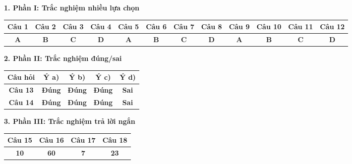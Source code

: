 \documentclass[12pt,a4paper]{article}
\begin{document}
\vspace{0.2cm}
\textbf{1. Phần I: Trắc nghiệm nhiều lựa chọn}
\begin{center}
{\setlength{\tabcolsep}{2.5pt}\small
\begin{tabular}{|c|c|c|c|c|c|c|c|c|c|c|c|}
\hline
\textbf{Câu 1} & \textbf{Câu 2} & \textbf{Câu 3} & \textbf{Câu 4} & \textbf{Câu 5} & \textbf{Câu 6} & \textbf{Câu 7} & \textbf{Câu 8} & \textbf{Câu 9} & \textbf{Câu 10} & \textbf{Câu 11} & \textbf{Câu 12} \\
\hline
\textbf{A} & \textbf{B} & \textbf{C} & \textbf{D} & \textbf{A} & \textbf{B} & \textbf{C} & \textbf{D} & \textbf{A} & \textbf{B} & \textbf{C} & \textbf{D} \\
\hline
\end{tabular}}
\end{center}

\vspace{0.2cm}
\textbf{2. Phần II: Trắc nghiệm đúng/sai}
\begin{center}
\begin{tabular}{|c|c|c|c|c|}
\hline
\textbf{Câu hỏi} & \textbf{Ý a)} & \textbf{Ý b)} & \textbf{Ý c)} & \textbf{Ý d)} \\
\hline
\textbf{Câu 13} & \textbf{Đúng} & \textbf{Đúng} & \textbf{Đúng} & \textbf{Sai} \\
\hline
\textbf{Câu 14} & \textbf{Đúng} & \textbf{Đúng} & \textbf{Đúng} & \textbf{Sai} \\
\hline
\end{tabular}
\end{center}

\vspace{0.2cm}
\textbf{3. Phần III: Trắc nghiệm trả lời ngắn}
\begin{center}
\begin{tabular}{|c|c|c|c|}
\hline
\textbf{Câu 15} & \textbf{Câu 16} & \textbf{Câu 17} & \textbf{Câu 18} \\
\hline
\textbf{10} & \textbf{60} & \textbf{7} & \textbf{23} \\
\hline
\end{tabular}
\end{center}
\end{document}
